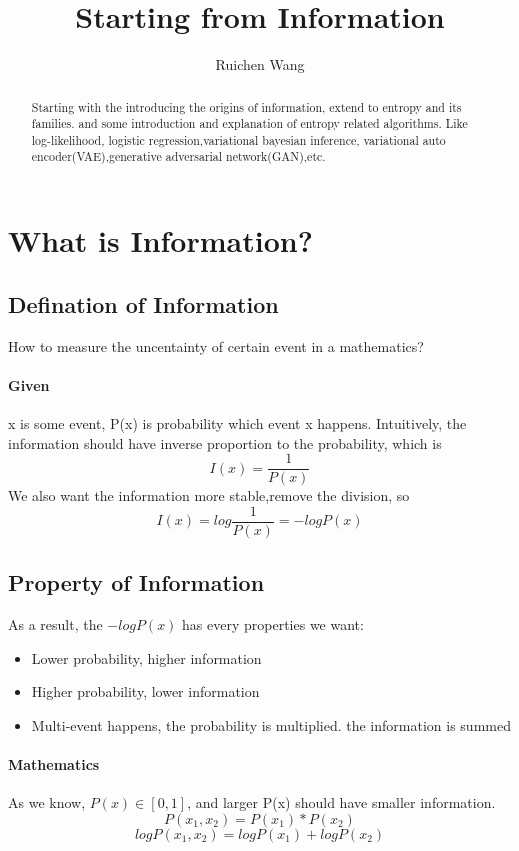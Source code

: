 \documentclass{article}
\author{Ruichen Wang}
\title{Starting from Information}
\begin{document}
\maketitle


\begin{abstract}
Starting with the introducing the origins of information, extend to entropy and its families. and some introduction and explanation of entropy related algorithms. Like log-likelihood, logistic regression,variational bayesian inference, variational auto encoder(VAE),generative adversarial network(GAN),etc.
\end{abstract}

\tableofcontents
\section{What is Information?} 
\subsection{Defination of Information}
How to measure the uncentainty of certain event in a mathematics?
\paragraph{Given} x is some event, P(x) is probability which event x happens. Intuitively, the information should have inverse proportion to the probability, which is 
$$I(x)=\frac{1}{P(x)}$$
We also want the information more stable,remove the division, so
$$I(x)=log\frac{1}{P(x)}=-logP(x)$$
\subsection{Property of Information}
As a result, the $-logP(x)$ has every properties we want:
\begin{itemize}
\item Lower probability, higher information
\item Higher probability, lower information
\item Multi-event happens, the probability is multiplied. the information is summed
\end{itemize}
\paragraph{Mathematics}
As we know, $P(x) \in [0,1]$, and larger P(x) should have smaller information.
$$P(x_{1},x_{2})=P(x_{1})*P(x_{2})$$
$$logP(x_{1},x_{2})=logP(x_{1})+logP(x_{2})$$
\end{document}
